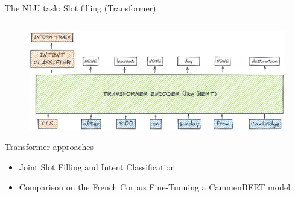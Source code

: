 \documentclass[10pt,aspectratio=169]{beamer}
\begin{document}
\begin{frame}{The NLU task: Slot filling (Transformer)}

       \begin{columns}
        \begin{column}{0.6\textwidth}
            \begin{figure}
                \centering
                \includegraphics[width=1.\textwidth]{media/transformer-bert-intent-slot.png}
                \label{fig:hahn-split}
            \end{figure}
            \begin{block}{Transformer approaches}
                \begin{itemize}
                    \item Joint Slot Filling and Intent Classification \cite{wu-2020-slotrefine}
                    \item Comparison on the French Corpus Fine-Tunning a CammenBERT model \cite{ghannay-etal-2020-neural} 
                \end{itemize}
                

\end{block}
\end{column}
\end{columns}
\end{frame}
\end{document}
